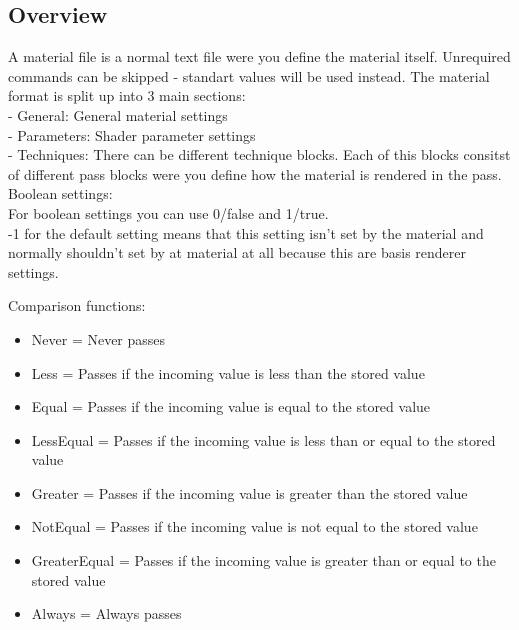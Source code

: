 \subsection{Overview}
A material file is a normal text file were you define the material itself. Unrequired commands can
be skipped - standart values will be used instead. The material format is split up into 3 main sections:\\
- General: General material settings\\
- Parameters: Shader parameter settings\\
- Techniques: There can be different technique blocks. Each of this blocks consitst of different pass blocks
  were you define how the material is rendered in the pass.\\



Boolean settings:\\
For boolean settings you can use 0/false and 1/true.\\

-1 for the default setting means that this setting isn't set by the material and
normally shouldn't set by at material at all because this are basis renderer settings.

Comparison functions:\\
\begin{itemize}
\item{Never        = Never passes}
\item{Less         = Passes if the incoming value is less than the stored value}
\item{Equal        = Passes if the incoming value is equal to the stored value}
\item{LessEqual    = Passes if the incoming value is less than or equal to the stored value}
\item{Greater      = Passes if the incoming value is greater than the stored value}
\item{NotEqual     = Passes if the incoming value is not equal to the stored value}
\item{GreaterEqual = Passes if the incoming value is greater than or equal to the stored value}
\item{Always       = Always passes}
\end{itemize}


